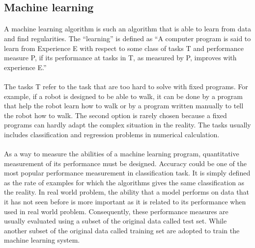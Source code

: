 \subsection{Machine learning}
\label{lr_sec:machine_learning}
\paragraph{}
A machine learning algorithm is such an algorithm that is able to learn from data and find regularities.
The ``learning'' is defined as ``A computer program is said to learn from Experience E with respect to some class of tasks T and performance measure P, if its performance at tasks in T, as measured by P, improves with experience E.'' \citep{Mitchell:1997:ML:541177}
\paragraph{}
The tasks T refer to the task that are too hard to solve with fixed programs.
For example, if a robot is designed to be able to walk, it can be done by a program that help the robot learn how to walk or by a program written manually to tell the robot how to walk.
The second option is rarely chosen because a fixed programs can hardly adapt the complex situation in the reality.
The tasks usually includes classification and regression problems in numerical calculation.

\paragraph{}
As a way to measure the abilities of a machine learning program, quantitative measurement of its performance must be designed.
Accuracy could be one of the most popular performance measurement in classification task.
It is simply defined as the rate of examples for which the algorithms gives the same classification as the reality.
In real world problem, the ability that a model performs on data that it has not seen before is more important as it is related to its performance when used in real world problem.
Consequently, these performance measures are usually evaluated using a subset of the original data called test set.
While another subset of the original data called training set are adopted to train the machine learning system.

